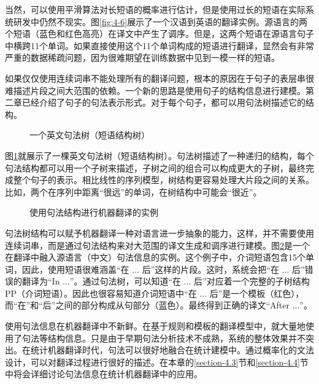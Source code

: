 \parinterval 当然，可以使用平滑算法对长短语的概率进行估计，但是使用过长的短语在实际系统研发中仍然不现实。图\ref{fig:4-6}展示了一个汉语到英语的翻译实例。源语言的两个短语（蓝色和红色高亮）在译文中产生了调序。但是，这两个短语在源语言句子中横跨11个单词。如果直接使用这个11个单词构成的短语进行翻译，显然会有非常严重的数据稀疏问题，因为很难期望在训练数据中见到一模一样的短语。

\parinterval 如果仅仅使用连续词串不能处理所有的翻译问题，根本的原因在于句子的表层串很难描述片段之间大范围的依赖。一个新的思路是使用句子的结构信息进行建模。第二章已经介绍了句子的句法表示形式。对于每个句子，都可以用句法树描述它的结构。

\begin{figure}[htp]
\centering

\caption{一个英文句法树（短语结构树）}
\label{fig:4-7}
\end{figure}

\parinterval 图\ref{fig:4-7}就展示了一棵英文句法树（短语结构树）。句法树描述了一种递归的结构，每个句法结构都可以用一个子树来描述，子树之间的组合可以构成更大的子树，最终完成整个句子的表示。相比线性的序列模型，树结构更容易处理大片段之间的关系。比如，两个在序列中距离``很远''的单词，在树结构中可能会``很近''。

\begin{figure}[htp]
\centering

\caption{使用句法结构进行机器翻译的实例}
\label{fig:4-8}
\end{figure}

\parinterval 句法树结构可以赋予机器翻译一种对语言进一步抽象的能力，这样，并不需要使用连续词串，而是通过句法结构来对大范围的译文生成和调序进行建模。图\ref{fig:4-8}是一个在翻译中融入源语言（中文）句法信息的实例。这个例子中，介词短语包含15个单词，因此，使用短语很难涵盖``在 $...$ 后''这样的片段。这时，系统会把``在 $...$ 后''错误的翻译为``In $...$''。通过句法树，可以知道``在 $...$ 后''对应着一个完整的子树结构PP（介词短语）。因此也很容易知道介词短语中``在 $...$ 后''是一个模板（红色），而``在''和``后''之间的部分构成从句部分（蓝色）。最终得到正确的译文``After $...$''。

\parinterval 使用句法信息在机器翻译中不新鲜。在基于规则和模板的翻译模型中，就大量地使用了句法等结构信息。只是由于早期句法分析技术不成熟，系统的整体效果并不突出。在统计机器翻译时代，句法可以很好地融合在统计建模中。通过概率化的文法设计，可以对翻译过程进行很好的描述。在本章的\ref{section-4.3}节和\ref{section-4.4}节中将会详细讨论句法信息在统计机器翻译中的应用。

